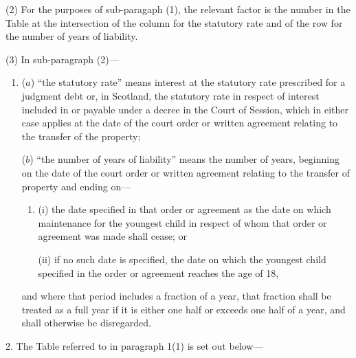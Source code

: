 \documentclass[12pt,a4paper]{article}
\begin{document}
(2) For the purposes of sub-paragaph (1), the relevant factor is the number in the Table at the intersection of the column for the statutory rate and of the row for the number of years of liability.

(3) In sub-paragraph (2)—
\begin{enumerate}\item[]
($a$) “the statutory rate” means interest at the statutory rate prescribed for a judgment debt or, in Scotland, the statutory rate in respect of interest included in or payable under a decree in the Court of Session, which in either case applies at the date of the court order or written agreement relating to the transfer of the property;

($b$) “the number of years of liability” means the number of years, beginning on the date of the court order or written agreement relating to the transfer of property and ending on—
\begin{enumerate}\item[]
(i) the date specified in that order or agreement as the date on which maintenance for the youngest child in respect of whom that order or agreement was made shall cease; or

(ii) if no such date is specified, the date on which the youngest child specified in the order or agreement reaches the age of 18,
\end{enumerate}
and where that period includes a fraction of a year, that fraction shall be treated as a full year if it is either one half or exceeds one half of a year, and shall otherwise be disregarded.
\end{enumerate}

\medskip

2.  The Table referred to in paragraph 1(1) is set out below—
\end{document}
